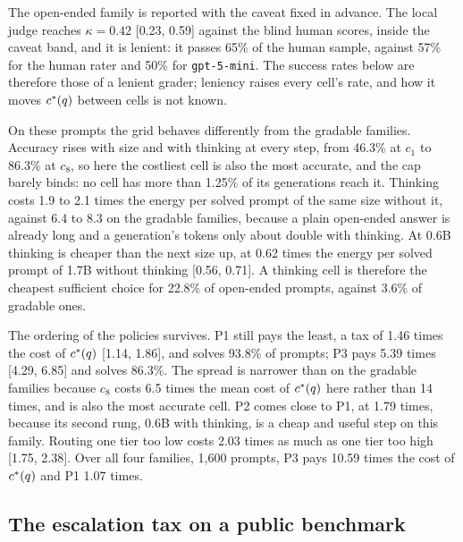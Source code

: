 The open-ended family is reported with the caveat fixed in advance. The local
judge reaches $\kappa = 0.42$ [0.23, 0.59] against the blind human scores,
inside the caveat band, and it is lenient: it passes 65\% of the human
sample, against 57\% for the human rater and 50\% for
\texttt{gpt-5-mini}. The success rates below are therefore those of a lenient
grader; leniency raises every cell's rate, and how it moves $c^{*}(q)$
between cells is not known.

On these prompts the grid behaves differently from the gradable families.
Accuracy rises with size and with thinking at every step, from 46.3\% at
$c_1$ to 86.3\% at $c_8$, so here the costliest cell is also the most
accurate, and the cap barely binds: no cell has more than 1.25\% of its
generations reach it. Thinking costs 1.9 to 2.1 times the energy per solved
prompt of the same size without it, against 6.4 to 8.3 on the gradable
families, because a plain open-ended answer is already long and a
generation's tokens only about double with thinking. At 0.6B thinking is
cheaper than the next size up, at 0.62 times the energy per solved prompt of
1.7B without thinking [0.56, 0.71]. A thinking cell is therefore the cheapest
sufficient choice for 22.8\% of open-ended prompts, against 3.6\% of gradable
ones.

The ordering of the policies survives. P1 still pays the least, a tax of 1.46
times the cost of $c^{*}(q)$ [1.14, 1.86], and solves 93.8\% of prompts; P3
pays 5.39 times [4.29, 6.85] and solves 86.3\%. The spread is narrower than
on the gradable families because $c_8$ costs 6.5 times the mean cost of
$c^{*}(q)$ here rather than 14 times, and is also the most accurate cell. P2
comes close to P1, at 1.79 times, because its second rung, 0.6B with
thinking, is a cheap and useful step on this family. Routing one tier too low
costs 2.03 times as much as one tier too high [1.75, 2.38]. Over all four
families, 1{,}600 prompts, P3 pays 10.59 times the cost of $c^{*}(q)$ and P1
1.07 times.

\subsection{The escalation tax on a public benchmark}
\label{sec:results-public}

\begin{table}[ht]
\centering
\small
\caption{Escalation policies on the public pool under oracle detection, in US
dollars per 1{,}000 queries. P1 climbs the cost--accuracy frontier, P3 uses
its top rung once, P4 starts uniformly over the pool and then climbs, and
Random picks a model uniformly and recovers at the top rung. A policy that
answers fewer queries can show a negative tax, underpaying by failing, so the
tax is read beside the solved column.}
\label{tab:public}

\end{table}

